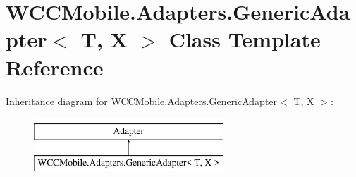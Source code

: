 \hypertarget{class_w_c_c_mobile_1_1_adapters_1_1_generic_adapter}{}\section{W\+C\+C\+Mobile.\+Adapters.\+Generic\+Adapter$<$ T, X $>$ Class Template Reference}
\label{class_w_c_c_mobile_1_1_adapters_1_1_generic_adapter}
Inheritance diagram for W\+C\+C\+Mobile.\+Adapters.\+Generic\+Adapter$<$ T, X $>$\+:\begin{figure}[H]
\begin{center}
\leavevmode
\includegraphics[height=2.000000cm]{class_w_c_c_mobile_1_1_adapters_1_1_generic_adapter}
\end{center}
\end{figure}
